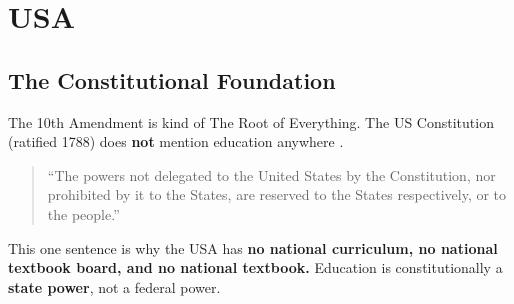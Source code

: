 \chapter{USA}

\section{The Constitutional Foundation}



The 10th Amendment is kind of The Root of Everything. The US Constitution (ratified 1788) does \textbf{not} mention education anywhere \cite{us-constitution}.

\begin{quote}
	``The powers not delegated to the United States by the Constitution, nor prohibited by it to the States, are reserved to the States respectively, or to the people.'' \cite{us-constitution}
\end{quote}

This one sentence is why the USA has \textbf{no national curriculum, no national textbook board, and no national textbook.} \cite{us-constitution} Education is constitutionally a \textbf{state power}, not a federal power.

\vspace{0.5cm}



